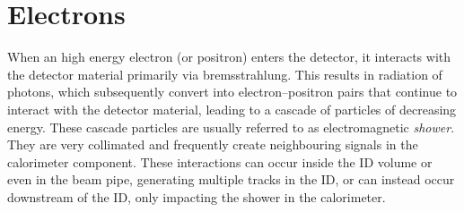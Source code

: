 \large
\section{Electrons}
\label{sec:electron}
When an high energy electron (or positron) enters the detector, 
it interacts with the detector material primarily via bremsstrahlung. 
This results in radiation of photons, which subsequently convert into 
electron–positron pairs that continue to 
interact with the detector material, 
leading to a cascade of particles of decreasing energy.
These cascade particles are usually referred to as electromagnetic \textit{shower}.
They are very collimated and frequently create 
neighbouring signals in the calorimeter component. 
These interactions can occur inside the ID volume 
or even in the beam pipe, generating multiple tracks
in the ID, or can instead occur downstream 
of the ID, only impacting the shower in
the calorimeter. 
